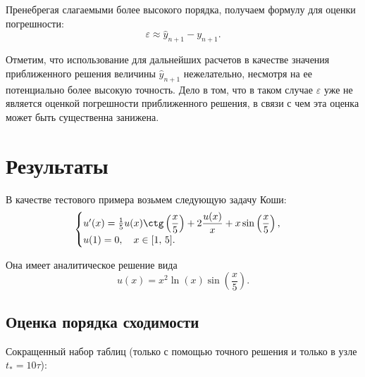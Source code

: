 \documentclass[12pt, a4paper]{article}
\begin{document}
\begin{enumerate}
		Пренебрегая слагаемыми более высокого порядка, получаем формулу для оценки погрешности:
		\[
		\varepsilon \approx \hat{y}_{n+1} - y_{n+1}.
		\]
		
		Отметим, что использование для дальнейших расчетов в качестве значения приближенного решения величины $\hat{y}_{n+1}$ нежелательно, несмотря на ее потенциально более высокую точность. Дело в том, что в таком случае $\varepsilon$ уже не является оценкой погрешности приближенного решения, в связи с чем эта оценка может быть существенна занижена.
		
		
	\end{enumerate}
	\newpage
	\section{Результаты}
	
	В качестве тестового примера возьмем следующую задачу Коши:
	\begin{equation*}
		\begin{cases}
			u'(x) = \frac15 u(x) \ctg\left(\dfrac{x}5\right) + 2 \dfrac{u(x)}{x} + x \sin\left(\dfrac{x}5\right), \\
			u(1) = 0, \quad x \in [1,\, 5].
		\end{cases}
	\end{equation*}
	
	Она имеет аналитическое решение вида
	\begin{equation*}
		u(x) = x^2 \ln(x) \sin\left(\frac{x}5\right).
	\end{equation*}
	
	\subsection{Оценка порядка сходимости}
	
	Сокращенный набор таблиц (только с помощью точного решения и только в узле $t_* = 10\tau$):
	
\end{document}
